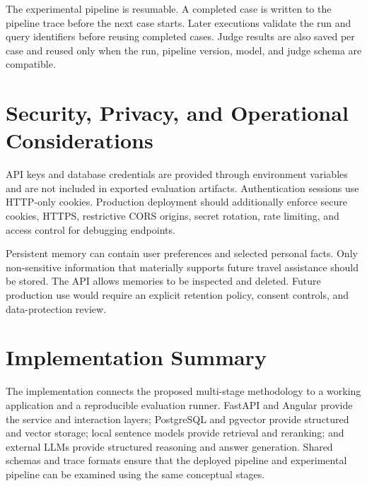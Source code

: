 The experimental pipeline is resumable. A completed case is written to the
pipeline trace before the next case starts. Later executions validate the run
and query identifiers before reusing completed cases. Judge results are also
saved per case and reused only when the run, pipeline version, model, and judge
schema are compatible.

\section{Security, Privacy, and Operational Considerations}

API keys and database credentials are provided through environment variables
and are not included in exported evaluation artifacts. Authentication sessions
use HTTP-only cookies. Production deployment should additionally enforce secure
cookies, HTTPS, restrictive CORS origins, secret rotation, rate limiting, and
access control for debugging endpoints.

Persistent memory can contain user preferences and selected personal facts.
Only non-sensitive information that materially supports future travel
assistance should be stored. The API allows memories to be inspected and
deleted. Future production use would require an explicit retention policy,
consent controls, and data-protection review.

\section{Implementation Summary}

The implementation connects the proposed multi-stage methodology to a working
application and a reproducible evaluation runner. FastAPI and Angular provide
the service and interaction layers; PostgreSQL and pgvector provide structured
and vector storage; local sentence models provide retrieval and reranking; and
external LLMs provide structured reasoning and answer generation. Shared
schemas and trace formats ensure that the deployed pipeline and experimental
pipeline can be examined using the same conceptual stages.

